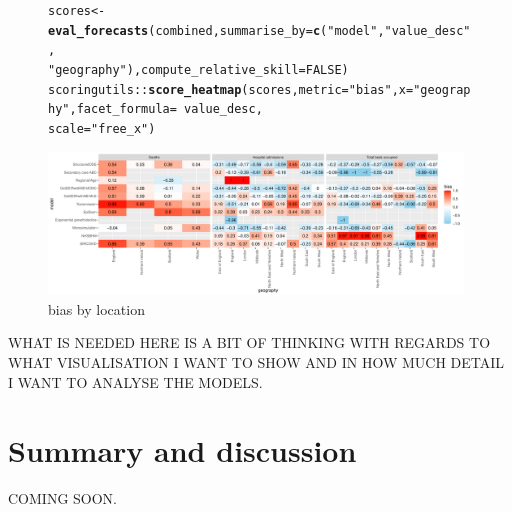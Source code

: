\documentclass[article,shortnames]{jss}\usepackage[]{graphicx}\usepackage[]{color}
\makeatletter
\newcommand{\hlnum}[1]{\textcolor[rgb]{0.686,0.059,0.569}{#1}}%
\newcommand{\hlstr}[1]{\textcolor[rgb]{0.192,0.494,0.8}{#1}}%
\newcommand{\hlopt}[1]{\textcolor[rgb]{0,0,0}{#1}}%
\newcommand{\hlstd}[1]{\textcolor[rgb]{0.345,0.345,0.345}{#1}}%
\newcommand{\hlkwb}[1]{\textcolor[rgb]{0.69,0.353,0.396}{#1}}%
\newcommand{\hlkwc}[1]{\textcolor[rgb]{0.333,0.667,0.333}{#1}}%
\newcommand{\hlkwd}[1]{\textcolor[rgb]{0.737,0.353,0.396}{\textbf{#1}}}%
\newenvironment{kframe}{%
 \def\at@end@of@kframe{}%
 \ifinner\ifhmode%
  \def\at@end@of@kframe{\end{minipage}}%
  \begin{minipage}{\columnwidth}%
 \fi\fi%
 \def\FrameCommand##1{\hskip\@totalleftmargin \hskip-\fboxsep
 \colorbox{shadecolor}{##1}\hskip-\fboxsep
     \hskip-\linewidth \hskip-\@totalleftmargin \hskip\columnwidth}%
 \MakeFramed {\advance\hsize-\width
   \@totalleftmargin\z@ \linewidth\hsize
   \@setminipage}}%
 {\par\unskip\endMakeFramed%
 \at@end@of@kframe}
\newenvironment{knitrout}{}{} %
\makeatother
\begin{document}
\begin{figure}[h]
\centering
\begin{knitrout}
\color{fgcolor}\begin{kframe}
\begin{alltt}
\hlstd{scores} \hlkwb{<-} \hlkwd{eval_forecasts}\hlstd{(combined,} \hlkwc{summarise_by} \hlstd{=} \hlkwd{c}\hlstd{(}\hlstr{"model"}\hlstd{,} \hlstr{"value_desc"}\hlstd{,}
    \hlstr{"geography"}\hlstd{),} \hlkwc{compute_relative_skill} \hlstd{=} \hlnum{FALSE}\hlstd{)}
\hlstd{scoringutils}\hlopt{::}\hlkwd{score_heatmap}\hlstd{(scores,} \hlkwc{metric} \hlstd{=} \hlstr{"bias"}\hlstd{,} \hlkwc{x} \hlstd{=} \hlstr{"geography"}\hlstd{,} \hlkwc{facet_formula} \hlstd{=} \hlopt{~}\hlstd{value_desc,}
    \hlkwc{scale} \hlstd{=} \hlstr{"free_x"}\hlstd{)}
\end{alltt}
\end{kframe}
\includegraphics[width=0.98\textwidth]{plots/plot-calibration-1} 
\end{knitrout}
\caption{\label{fig:bias-heatmap} bias by location}
\end{figure}

WHAT IS NEEDED HERE IS A BIT OF THINKING WITH REGARDS TO WHAT VISUALISATION I WANT TO SHOW AND IN HOW MUCH DETAIL I WANT TO ANALYSE THE MODELS. 






\section{Summary and discussion} \label{sec:summary}

COMING SOON. 


\end{document}
